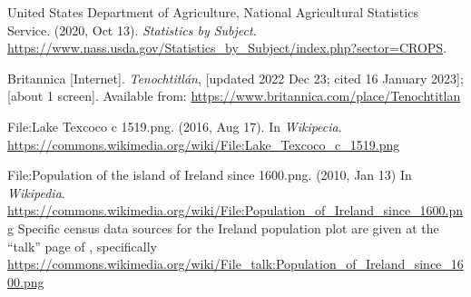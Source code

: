 \documentclass[jou]{apa7}
\begin{document}
\begin{thebibliography}{99}
United States Department of Agriculture, National Agricultural Statistics Service.
(2020, Oct 13).
\textit{Statistics by Subject}.
\url{https://www.nass.usda.gov/Statistics_by_Subject/index.php?sector=CROPS}.  















Britannica [Internet].
\textit{Tenochtitlán},
[updated 2022 Dec 23; cited 16 January 2023]; [about 1 screen].
Available from: \url{https://www.britannica.com/place/Tenochtitlan}

File:Lake Texcoco c 1519.png.
(2016, Aug 17).
In \textit{Wikipecia}.
\url{https://commons.wikimedia.org/wiki/File:Lake\_Texcoco\_c\_1519.png}


File:Population of the island of Ireland since 1600.png.
(2010, Jan 13)
In \textit{Wikipedia}.
\url{https://commons.wikimedia.org/wiki/File:Population\_of\_Ireland\_since\_1600.png}
Specific census data sources for the Ireland population plot are given at the ``talk'' page of \cite{pop_image}, specifically
\url{https://commons.wikimedia.org/wiki/File\_talk:Population\_of\_Ireland\_since\_1600.png}





\end{thebibliography}
\end{document}

